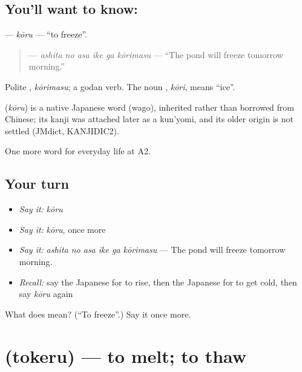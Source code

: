 \subsection*{You'll want to know: }
\textbf{} — \emph{kōru} — \textquotedblleft{}to freeze\textquotedblright{}.

\begin{quote}
\textbf{   } — \emph{ashita no asa ike ga kōrimasu} — \textquotedblleft{}The pond will freeze tomorrow morning.\textquotedblright{}
\end{quote}

Polite \textbf{}, \emph{kōrimasu}; a godan verb. The noun \textbf{}, \emph{kōri}, means \textquotedblleft{}ice\textquotedblright{}.

\begin{cousinweb}
\textbf{} (\emph{kōru}) is a native Japanese word (wago), inherited rather than borrowed from Chinese; its kanji was attached later as a kun'yomi, and its older origin is not settled (JMdict, KANJIDIC2).
\end{cousinweb}

\begin{grammarlens}[title={What you've built}]
One more word for everyday life at A2.
\end{grammarlens}

\subsection*{Your turn}
\begin{itemize}
\raggedright
  \item \emph{Say it:} \emph{kōru}
  \item \emph{Say it:} \emph{kōru}, once more
  \item \emph{Say it:} \emph{ashita no asa ike ga kōrimasu} — The pond will freeze tomorrow morning.
  \item \emph{Recall:} say the Japanese for to rise, then the Japanese for to get cold, then say \emph{kōru} again
\end{itemize}

\begin{tcolorbox}[breakable,colback=teal!4,colframe=teal!35!black,title={Before you move on}]
What does  mean? (\textquotedblleft{}To freeze\textquotedblright{}.) Say it once more.
\end{tcolorbox}
\section[\texorpdfstring{\ja{とける} (tokeru)}{とける (tokeru)}]{ (tokeru) — to melt; to thaw}

